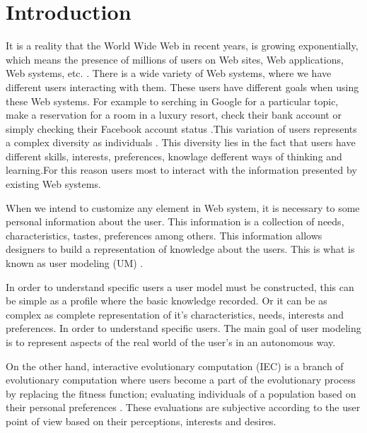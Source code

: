 \chapter{Introduction} \label{introduction}


\par It is a reality that the World Wide Web in recent years, is growing
exponentially, which means the presence of millions of users on Web sites, Web
applications, Web systems, etc. \cite{albert1999internet}. There is a wide
variety of Web systems, where we have different users interacting with them.
These users have different goals when using these Web systems. For example to
serching  in Google \cite{google} for a particular topic, make a reservation for
a room in a luxury resort, check their bank account or simply checking their
Facebook account status \cite{cockburn2001web}.This variation of users
represents a complex diversity as individuals \cite{}. This diversity lies in the
fact that users have different skills, interests, preferences, knowlage
defferent  ways of thinking and learning.For this reason users most to interact
with the information presented by existing Web systems.

\par When we intend to customize any element in Web system,  it is necessary to
some personal information about the user. This information is a collection of
needs, characteristics, tastes, preferences among others.  This information
allows designers to build a representation of knowledge about the users. This is
what is known as user modeling (UM) \cite{}.

\par  In order to understand specific users a user model must be constructed,
this can be simple as a profile where the basic knowledge recorded. Or it can be
as complex as complete representation of it's characteristics, needs, interests
and preferences. In order to understand specific users. The main goal of user
modeling is to represent aspects of the real world of the user's in an
autonomous way.

\par On the other hand, interactive evolutionary computation (IEC)
is a branch of evolutionary computation where users become a part of the
evolutionary process by replacing the fitness function; evaluating individuals
of a population based on their personal preferences \cite{}. These evaluations are
subjective according to the user point of view based on their perceptions,
interests and desires.

